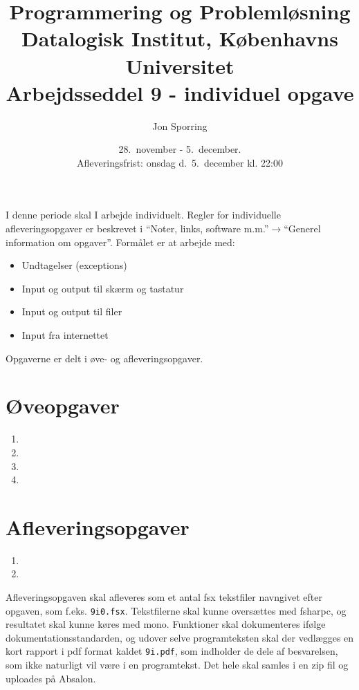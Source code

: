 \documentclass[a4paper,12pt]{article}
\title{Programmering og Problemløsning\\Datalogisk Institut,
  Københavns Universitet\\Arbejdsseddel 9 - individuel opgave}
\author{Jon Sporring}
\date{28.\ november - 5.\ december.\\Afleveringsfrist: onsdag d.\ 5.\ december kl. 22:00}
\begin{document}
\maketitle

I denne periode skal I arbejde individuelt. Regler for individuelle afleveringsopgaver er beskrevet i "`Noter, links, software m.m."'$\rightarrow$"`Generel information om opgaver"'. Formålet er at arbejde med:
\begin{itemize}
\item Undtagelser (exceptions)
\item Input og output til skærm og tastatur
\item Input og output til filer
\item Input fra internettet
\end{itemize}

Opgaverne er delt i øve- og afleveringsopgaver. 

\section*{Øveopgaver}

\begin{enumerate}[label=9ø.\arabic*,start=0]
\item 
\item 
\item 
\item 
\end{enumerate}

\section*{Afleveringsopgaver}
\begin{enumerate}[label=8i.\arabic*,start=0]
\item 
\item 
\end{enumerate}

Afleveringsopgaven skal afleveres som et antal fsx tekstfiler navngivet efter opgaven, som f.eks. \lstinline!9i0.fsx!. Tekstfilerne skal kunne oversættes med fsharpc, og resultatet skal kunne køres med mono. Funktioner skal dokumenteres ifølge dokumentationsstandarden, og udover selve programteksten skal der vedlægges en kort rapport i pdf format kaldet \lstinline{9i.pdf}, som indholder de dele af besvarelsen, som ikke naturligt vil være i en programtekst. Det hele skal samles i en zip fil og uploades på Absalon.
\end{document}
